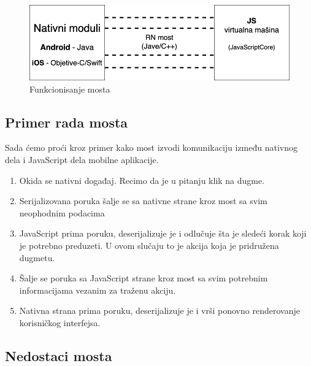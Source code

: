 \documentclass[12pt,oneside]{memoir}
\begin{document}
\begin{figure}[h]
    \centering
    \includegraphics[scale=0.5]{docs/images/chapterThree/reactNativeBridge.png}
    \caption{Funkcionisanje mosta}
    \label{fig:reactNativeBridge}
\end{figure}

\subsection{Primer rada mosta}

Sada ćemo proći kroz primer kako most izvodi komunikaciju između nativnog dela i JavaScript dela mobilne aplikacije.

\begin{enumerate}
    \item Okida se nativni događaj. Recimo da je u pitanju klik na dugme.
    \item Serijalizovana poruka šalje se sa nativne strane kroz most sa svim neophodnim podacima
    \item JavaScript prima poruku, deserijalizuje je i odlučuje šta je sledeći korak koji je potrebno preduzeti. U ovom slučaju to je akcija koja je pridružena dugmetu.
    \item Šalje se poruka sa JavaScript strane kroz most sa svim potrebnim informacijama vezanim za traženu akciju.
    \item Nativna strana prima poruku, deserijalizuje je i vrši ponovno renderovanje korisničkog interfejsa.
\end{enumerate}

\subsection{Nedostaci mosta}
\end{document}
